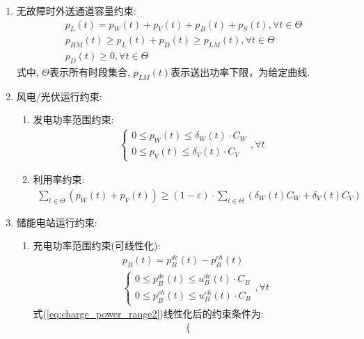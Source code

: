 \documentclass{article}
\begin{document}
\begin{enumerate}
    \item {无故障时外送通道容量约束:
        \begin{gather}
            p_L(t)=p_W(t)+p_V(t)+p_B(t)+p_S(t),\forall t\in\Theta\\
            p_{HM}(t)\geq p_L(t)+p_D(t)\geq p_{LM}(t),\forall t\in\Theta\\
            p_D(t)\geq0,\forall t\in\Theta
        \end{gather}
        式中, $\Theta$表示所有时段集合, $p_{LM}(t)$表示送出功率下限，为给定曲线.
    }
    \item {风电/光伏运行约束:
        \begin{enumerate}
            \item {发电功率范围约束:
                \begin{align}
                    \begin{cases}0\leq p_W(t)\leq\delta_W(t)\cdot C_W\\0\leq p_V(t)\leq\delta_V(t)\cdot C_V\end{cases},\forall t
                \end{align}
            }
            \item {利用率约束:
                \begin{align}
                    \sum_{t\in\Theta}\left(p_W(t)+p_V(t)\right)\geq(1-\varepsilon)\cdot\sum_{t\in\Theta}\left(\delta_W(t)C_W+\delta_V(t)C_V\right)
                \end{align}
            }
        \end{enumerate}
    }
    \item {储能电站运行约束:
        \begin{enumerate}
            \item {充电功率范围约束({\color{red}可线性化}):
                \begin{align}
                    & p_{B}(t)=p_{B}^{dc}(t)-p_{B}^{ch}(t) \\
                    & \begin{cases}0\leq p_B^{dc}(t)\leq u_B^{dc}(t)\cdot C_B\\0\leq p_B^{ch}(t)\leq u_B^{ch}(t)\cdot C_B\end{cases},\forall t \label{eq:charge_power_range2} 
                \end{align}
                式(\ref{eq:charge_power_range2})线性化后的约束条件为:
                \begin{align}
                    \begin{cases}

\end{cases}
\end{align}}
\end{enumerate}}
\end{enumerate}
\end{document}
